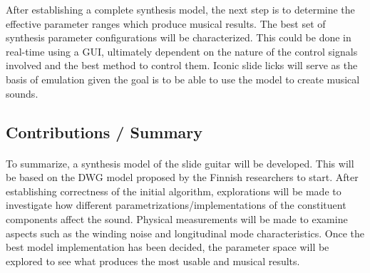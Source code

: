 \documentclass[12pt]{article}
\begin{document}
After establishing a complete synthesis model, the next step is to determine the effective parameter ranges which produce musical results. The best set of synthesis parameter configurations will be characterized. This could be done in real-time using a GUI, ultimately dependent on the nature of the control signals involved and the best method to control them. Iconic slide licks will serve as the basis of emulation given the goal is to be able to use the model to create musical sounds.

\subsection*{Contributions / Summary}
\paragraph{}
To summarize, a synthesis model of the slide guitar will be developed. This will be based on the DWG model proposed by the Finnish researchers to start. After establishing correctness of the initial algorithm, explorations will be made to investigate how different parametrizations/implementations of the constituent components affect the sound. Physical measurements will be made to examine aspects such as the winding noise and longitudinal mode characteristics. Once the best model implementation has been decided, the parameter space will be explored to see what produces the most usable and musical results.

\clearpage


\end{document}
